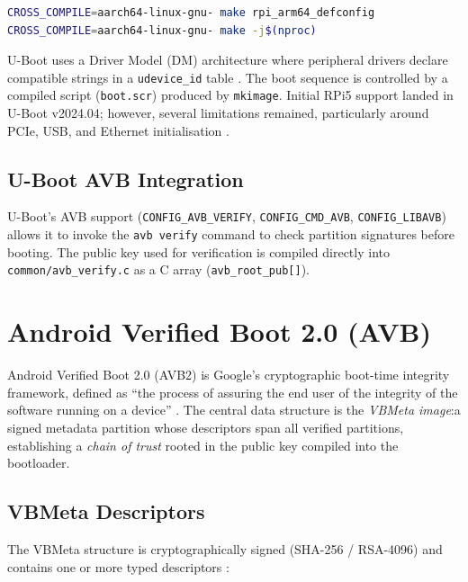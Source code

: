 \begin{lstlisting}[language=bash]
CROSS_COMPILE=aarch64-linux-gnu- make rpi_arm64_defconfig
CROSS_COMPILE=aarch64-linux-gnu- make -j$(nproc)
\end{lstlisting}

U-Boot uses a Driver Model (DM) architecture where peripheral drivers declare compatible strings in a \texttt{udevice\_id} table \cite{uboot_serial_pl01x}. The boot sequence is controlled by a compiled script (\texttt{boot.scr}) produced by \texttt{mkimage}. Initial RPi5 support landed in U-Boot v2024.04; however, several limitations remained, particularly around PCIe, USB, and Ethernet initialisation \cite{uboot_rpi5_forum, rpi5_uboot_boot_issues}.

\subsection{U-Boot AVB Integration}

U-Boot's AVB support (\texttt{CONFIG\_AVB\_VERIFY}, \texttt{CONFIG\_CMD\_AVB}, \texttt{CONFIG\_LIBAVB}) allows it to invoke the \texttt{avb verify} command to check partition signatures before booting. The public key used for verification is compiled directly into \texttt{common/avb\_verify.c} as a C array (\texttt{avb\_root\_pub[]}).

\section{Android Verified Boot 2.0 (AVB)}
\label{sec:bg_avb}

Android Verified Boot 2.0 (AVB2) is Google's cryptographic boot-time integrity framework, defined as ``the process of assuring the end user of the integrity of the software running on a device'' \cite{avb2_readme}. The central data structure is the \emph{VBMeta image}:a signed metadata partition whose descriptors span all verified partitions, establishing a \emph{chain of trust} rooted in the public key compiled into the bootloader.

\subsection{VBMeta Descriptors}
\label{sec:bg_avb_descriptors}

The VBMeta structure is cryptographically signed (SHA-256 / RSA-4096) and contains one or more typed descriptors \cite{avb2_readme}:

